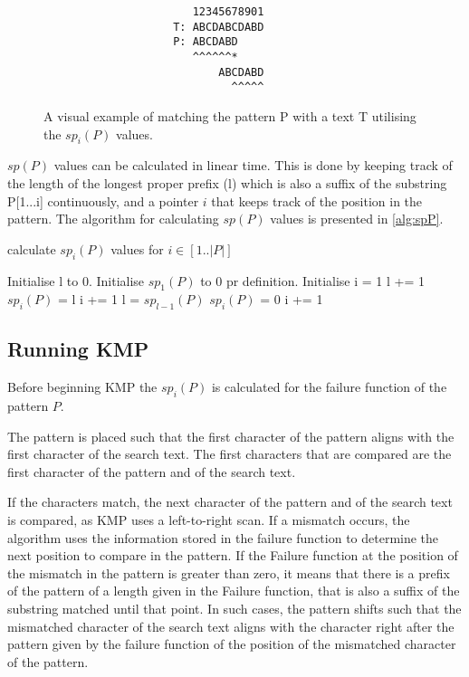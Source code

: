 \begin{figure}[H]
\begin{verbatim}
                       12345678901
                    T: ABCDABCDABD
                    P: ABCDABD
                       ^^^^^^*
                           ABCDABD
                             ^^^^^
\end{verbatim}
\caption{A visual example of matching the pattern P with a text T utilising the $sp_i(P)$ values.}
\label{fig:KMPshift}
\end{figure}

$sp(P)$ values can be calculated in linear time. This is done by keeping track of the length of the longest proper prefix (l) which is also a suffix of the substring P[1...i] continuously, and a pointer $i$ that keeps track of the position in the pattern. The algorithm for calculating $sp(P)$ values is presented in \ref{alg:spP}.

\begin{algorithm}[t]
\caption{calculate $sp_i(P)$ values for $i \in [1..|P|]$}\label{alg:spP}
\begin{algorithmic}
\State Initialise l to 0.
\State Initialise $sp_1(P)$ to 0 pr definition.
\State Initialise i = 1
        \State l += 1
        \State $sp_i(P)$ = l
        \State i += 1
    \Else
            \State l = $sp_{l-1}(P)$
        \Else
            \State $sp_{i}(P)$ = 0
            \State i += 1
        \EndIf
    \EndIf
    

\EndWhile

\end{algorithmic}
\end{algorithm}

\subsection{Running KMP}
Before beginning KMP the $sp_i(P)$ is calculated for the failure function of the pattern $P$. 

The pattern is placed such that the first character of the pattern aligns with the first character of the search text. The first characters that are compared are the first character of the pattern and of the search text. 

If the characters match, the next character of the pattern and of the search text is compared, as KMP uses a left-to-right scan. 
If a mismatch occurs, the algorithm uses the information stored in the failure function to determine the next position to compare in the pattern. If the Failure function at the position of the mismatch in the pattern is greater than zero, it means that there is a prefix of the pattern of a length given in the Failure function, that is also a suffix of the substring matched until that point. In such cases, the pattern shifts such that the mismatched character of the search text aligns with the character right after the pattern given by the failure function of the position of the mismatched character of the pattern.

